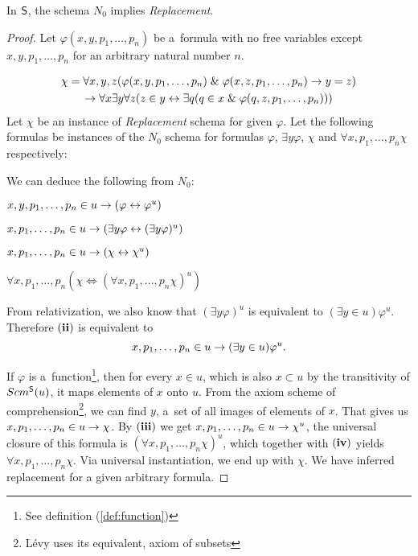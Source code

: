 \begin{theorem}
In $\sf{S}$, the schema $N_0$ implies \emph{Replacement}.
\end{theorem}

\begin{proof}
Let $\varphi(x, y, p_1, \ldots, p_n)$ be a~formula with no free variables except $x, y, p_1, \ldots, p_n$ for an arbitrary natural number $n$.

\begin{equation}
\begin{gathered}
\chi = \forall x, y, z(\varphi(x, y, p_1, \ldots, p_n) \mathrel{\&} \varphi(x, z, p_1, \ldots, p_n) \rightarrow y = z) \\
\rightarrow \forall x \exists y \forall z (z \in y \leftrightarrow \exists q (q \in x \mathrel{\&} \varphi(q, z, p_1, \ldots, p_n)))
\end{gathered}
\end{equation}
Let $\chi$ be an instance of \emph{Replacement} schema for given $\varphi$. Let the following formulas be instances of the $N_0$ schema for formulas  $\varphi$, $\exists y \varphi$, $\chi$ and $\forall x, p_1, \ldots, p_n \chi$ respectively:

We can deduce the following from $N_0$: 
\bce[(i)]
\item $x, y, p_1, \ldots, p_n \in u \rightarrow (\varphi \leftrightarrow \varphi^{u}) $
\item $x, p_1, \ldots, p_n \in u \rightarrow (\exists y \varphi \leftrightarrow (\exists y \varphi)^{u})$
\item $x, p_1, \ldots, p_n \in u \rightarrow (\chi \leftrightarrow \chi^{u})$
\item $\forall x, p_1, \ldots, p_n (\chi \iff (\forall x, p_1, \ldots, p_n \chi)^{u})$
\ece

From relativization, we also know that $(\exists y \varphi)^{u}$ is equivalent to $(\exists y \in u) \varphi^{u}$.
Therefore $\bold{(ii)}$ is equivalent to
\begin{equation}
x, p_1, \ldots, p_n \in u \rightarrow (\exists y \in u) \varphi^{u}. 
\end{equation}

If $\varphi$ is a~function\footnote{See definition (\ref{def:function})}, then for every $x \in u$, which is also $x \subset u$ by the transitivity of $Scm^{\sf{S}}(u)$,
it maps elements of $x$ onto $u$. From the axiom scheme of comprehension\footnote{Lévy uses its equivalent, axiom of subsets}, we can find $y$, a~set of all images of elements of $x$.
That gives us $x, p_1, \ldots, p_n \in u \rightarrow \chi$. By $\bold{(iii)}$ we get $x, p_1, \ldots, p_n \in u \rightarrow \chi^{u}$, the universal closure of this formula is $(\forall x, p_1, \ldots, p_n \chi)^{u}$, 
which together with $\bold{(iv)}$ yields $\forall x, p_1, \ldots, p_n \chi$. Via universal instantiation, we end up with $\chi$. We have inferred replacement for a given arbitrary formula. 
\end{proof}

